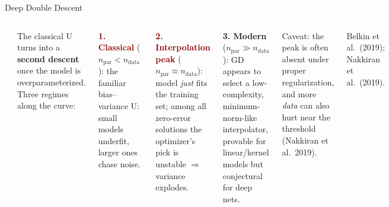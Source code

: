 \documentclass[aspectratio=169,11pt]{beamer}
\newcommand{\emphc}[1]{\textcolor{harvardcrimson}{#1}}
\begin{document}
\begin{frame}{Deep Double Descent}
\begin{columns}[T]
\begin{center}
\end{center}

{\scriptsize The classical U turns into a \textbf{second descent} once the model is \emphc{overparameterized}. Three regimes along the curve:

\vspace{0.08cm}
\textcolor{darkred}{\textbf{1. Classical}} ($n_\text{par}\!<\!n_\text{data}$): the familiar bias--variance U: small models underfit, larger ones chase noise.

\vspace{0.06cm}
\textcolor{darkred}{\textbf{2. Interpolation peak}} ($n_\text{par}\!\approx\!n_\text{data}$): model \emph{just} fits the training set; among all zero-error solutions the optimizer's pick is unstable $\Rightarrow$ variance explodes.

\vspace{0.06cm}
\textcolor{softgreen}{\textbf{3. Modern}} ($n_\text{par}\!\gg\!n_\text{data}$): GD appears to select a low-complexity, \emphc{minimum-norm-like} interpolator, provable for linear/kernel models but conjectural for deep nets.

\vspace{0.06cm}
\emphc{Caveat:} the peak is often absent under proper regularization, and more \emph{data} can also hurt near the threshold (Nakkiran et al.\ 2019).

{\scriptsize Belkin et al.\ (2019); Nakkiran et al.\ (2019).}}
\end{columns}
\end{frame}
\end{document}
